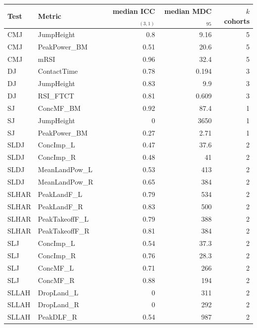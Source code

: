 \begin{tabular}{llrrr}
\toprule
Test & Metric & median ICC$_{(3,1)}$ & median MDC$_{95}$ & $k$ cohorts \\
\midrule
CMJ & JumpHeight & 0.8 & 9.16 & 5 \\
CMJ & PeakPower\_BM & 0.51 & 20.6 & 5 \\
CMJ & mRSI & 0.96 & 32.4 & 5 \\
DJ & ContactTime & 0.78 & 0.194 & 3 \\
DJ & JumpHeight & 0.83 & 9.9 & 3 \\
DJ & RSI\_FTCT & 0.81 & 0.609 & 3 \\
SJ & ConcMF\_BM & 0.92 & 87.4 & 1 \\
SJ & JumpHeight & 0 & 3650 & 1 \\
SJ & PeakPower\_BM & 0.27 & 2.71 & 1 \\
SLDJ & ConcImp\_L & 0.47 & 37.6 & 2 \\
SLDJ & ConcImp\_R & 0.48 & 41 & 2 \\
SLDJ & MeanLandPow\_L & 0.53 & 413 & 2 \\
SLDJ & MeanLandPow\_R & 0.65 & 384 & 2 \\
SLHAR & PeakLandF\_L & 0.79 & 534 & 2 \\
SLHAR & PeakLandF\_R & 0.83 & 500 & 2 \\
SLHAR & PeakTakeoffF\_L & 0.79 & 388 & 2 \\
SLHAR & PeakTakeoffF\_R & 0.81 & 384 & 2 \\
SLJ & ConcImp\_L & 0.54 & 37.3 & 2 \\
SLJ & ConcImp\_R & 0.76 & 28.3 & 2 \\
SLJ & ConcMF\_L & 0.71 & 266 & 2 \\
SLJ & ConcMF\_R & 0.88 & 194 & 2 \\
SLLAH & DropLand\_L & 0 & 311 & 2 \\
SLLAH & DropLand\_R & 0 & 292 & 2 \\
SLLAH & PeakDLF\_R & 0.54 & 987 & 2 \\
\bottomrule
\end{tabular}
